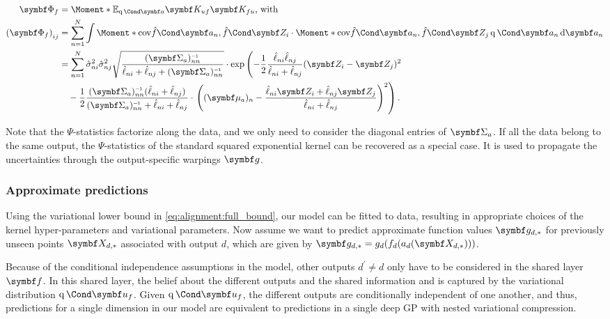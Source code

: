 \begin{equation}
    \begin{split}
        \mat{\Phi_f} &= \Moment*{\E_{\Variat{\rv{a}}}}{\mat{K_{uf}}\mat{K_{fu}}}\text{, with} \\
        \left(\mat{\Phi_f} \right)_{ij} &= \sum_{n=1}^N \int \Moment*{\cov}{\Fun{\hat{f}}{\mat{a}_n}, \Fun{\hat{f}}{\mat{Z}_i}}
        \cdot \Moment*{\cov}{\Fun{\hat{f}}{\mat{a}_n}, \Fun{\hat{f}}{\mat{Z}_j}} \Variat{\rv{a}_n} \diff \rv{a}_n \\
        &= \sum_{n=1}^N \hat{\sigma}_{ni}^2 \hat{\sigma}_{nj}^2 \sqrt{\frac{(\mat{\Sigma}_a)_{nn}\inv}{\hat{\ell}_{ni} + \hat{\ell}_{nj} + (\mat{\Sigma}_a)_{nn}\inv}}
        \cdot \exp\left( -\frac{1}{2} \frac{\hat{\ell}_{ni}\hat{\ell}_{nj}}{\hat{\ell}_{ni} + \hat{\ell}_{nj}} (\mat{Z}_i - \mat{Z}_j)^2 \right. \\
        &\quad {} - \frac{1}{2} \frac{(\mat{\Sigma}_a)_{nn}\inv(\hat{\ell}_{ni} + \hat{\ell}_{nj})}{(\mat{\Sigma}_a)_{nn}\inv + \hat{\ell}_{ni} + \hat{\ell}_{nj}}
        \cdot \left.\left( (\mat{\mu}_a)_n - \frac{\hat{\ell}_{ni} \mat{Z}_i + \hat{\ell}_{nj} \mat{Z}_j}{\hat{\ell}_{ni} + \hat{\ell}_{nj}} \right)^2 \right).
    \end{split}
\end{equation}

Note that the $\Psi$-statistics factorize along the data, and we only need to consider the diagonal entries of $\mat{\Sigma}_a$.
If all the data belong to the same output, the $\Psi$-statistics of the standard squared exponential kernel can be recovered as a special case.
It is used to propagate the uncertainties through the output-specific warpings $\rv{g}$.

\subsubsection{Approximate predictions}
Using the variational lower bound in \cref{eq:alignment:full_bound}, our model can be fitted to data, resulting in appropriate choices of the kernel hyper-parameters and variational parameters.
Now assume we want to predict approximate function values $\mat{g}_{d, \ast}$ for previously unseen points $\mat{X}_{d, \ast}$ associated with output $d$, which are given by $ \mat{g}_{d, \ast} = g_d(f_d(a_d(\mat{X}_{d, \ast})))$.

Because of the conditional independence assumptions in the model, other outputs $d^\prime \neq d$ only have to be considered in the shared layer $\rv{f}$.
In this shared layer, the belief about the different outputs and the shared information and is captured by the variational distribution $\Variat{\rv{u}_f}$.
Given $\Variat{\rv{u}_f}$, the different outputs are conditionally independent of one another, and thus, predictions for a single dimension in our model are equivalent to predictions in a single deep GP with nested variational compression.


